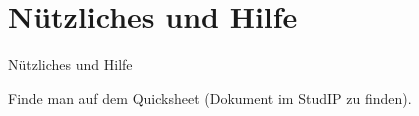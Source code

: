 \documentclass[notes=hide,hyperref={dvipdfmx,pdfpagelabels=false}]{beamer}
\begin{document}
\section{Nützliches und Hilfe}
\begin{frame}[fragile]{Nützliches und Hilfe}
\begin{center}
Finde man auf dem \alert{Quicksheet} (Dokument im StudIP zu finden).
\end{center}
\end{frame}
%
%
\end{document}
